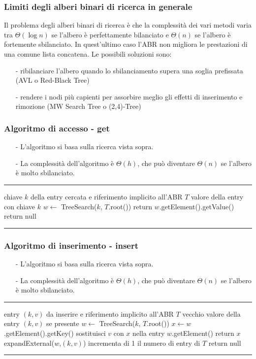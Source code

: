 \documentclass[a4paper]{article}
\makeatletter
\newenvironment{algo}[4]{
	\noindent\rule{\textwidth}{0.4pt}
	\begin{algorithmic}[1]
		\addtocounter{ALG@line}{-1}
		\Procedure{#1}{#2}
		\Require #3
		\Ensure #4
		\Statex }{
		\EndProcedure
	\end{algorithmic}
	\rule{\textwidth}{0.4pt}}
\makeatother
\begin{document}
\subsubsection*{Limiti degli alberi binari di ricerca in generale}
Il problema degli alberi binari di ricerca è che la complessità dei vari metodi varia tra \(\Theta(\log n)\) se l'albero è
perfettamente bilanciato e \(\Theta(n)\) se l'albero è fortemente sbilanciato. In quest'ultimo caso l'ABR non migliora le
prestazioni di una comune lista concatena. Le possibili soluzioni sono:
\begin{itemize}[topsep=3pt, itemsep=0pt]
	\item[-] ribilanciare l'albero quando lo sbilanciamento supera una soglia prefissata (AVL o Red-Black Tree)
	\item[-] rendere i nodi più capienti per assorbire meglio gli effetti di inserimento e rimozione (MW Search Tree o (2,4)-Tree)
\end{itemize}

\subsubsection*{Algoritmo di accesso - get}
\begin{itemize}[topsep=3pt, itemsep=0pt]
	\item[-] L'algoritmo si basa sulla ricerca vista sopra.
	\item[-] La complessità dell'algoritmo è \(\Theta(h)\), che può diventare \(\Theta(n)\) se l'albero è molto sbilanciato.
\end{itemize}
\begin{algo}{get}{$k$}{chiave $k$ della entry cercata e riferimento implicito all'ABR $T$}{valore della entry con chiave $k$}
	\State $w \gets$ TreeSearch($k$, $T$.root())
		\State return $w$.getElement().getValue()
	\Else
		\State return null
	\EndIf
\end{algo}

\subsubsection*{Algoritmo di inserimento - insert}
\begin{itemize}[topsep=3pt, itemsep=0pt]
	\item[-] L'algoritmo si basa sulla ricerca vista sopra.
	\item[-] La complessità dell'algoritmo è \(\Theta(h)\), che può diventare \(\Theta(n)\) se l'albero è molto sbilanciato.
\end{itemize}
\begin{algo}{put}{$k$, $v$}{entry $(k,v)$ da inserire e riferimento implicito all'ABR $T$}{vecchio valore della entry $(k,v)$ se presente}
	\State $w \gets$ TreeSearch($k$, $T$.root())
		\State $x \gets w$.getElement().getKey()
		\State sostituisci $v$ con $x$ nella entry $w$.getElement()
		\State return $x$
	\Else
		\State expandExternal($w$,$(k,v)$)
		\State incrementa di 1 il numero di entry di $T$
		\State return null
	\EndIf
\end{algo}
\end{document}
